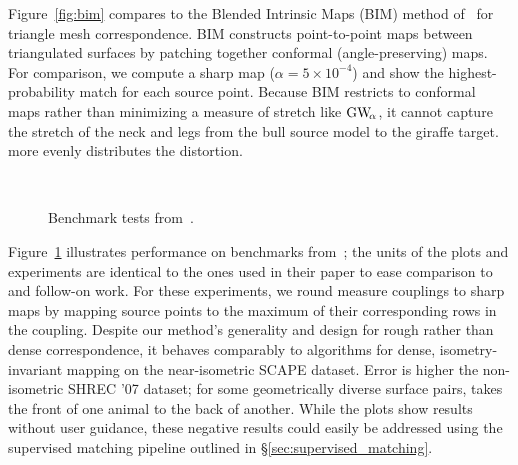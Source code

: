 Figure~\ref{fig:bim} compares to the Blended Intrinsic Maps (BIM) method of~\cite{kim-2011} for triangle mesh correspondence.  BIM constructs point-to-point maps between triangulated surfaces by patching together conformal (angle-preserving) maps.  For comparison, we compute a sharp \GWa map ($\alpha\!=\!5\!\times\!10^{-4}$) and show the highest-probability match for each source point.  Because BIM restricts to conformal maps rather than minimizing a measure of stretch like $\GWa$, it cannot capture the stretch of the neck and legs from the bull source model to the giraffe target.  \GWa more evenly distributes the distortion.

\begin{figure}[t]\centering
{}\\\vspace{-.2in}
\caption{Benchmark tests from~\protect\cite{kim-2011}.\vspace{-.2in}}\label{fig:benchmarks}
\end{figure}

Figure~\ref{fig:benchmarks} illustrates performance on benchmarks from~\cite{kim-2011}; the units of the plots and experiments are identical to the ones used in their paper to ease comparison to~\cite{kim-2011} and follow-on work.  For these experiments, we round measure couplings to sharp maps by mapping source points to the maximum of their corresponding rows in the coupling.  Despite our method's generality and design for rough rather than dense correspondence, it behaves comparably to algorithms for dense, isometry-invariant mapping on the near-isometric SCAPE dataset.  Error is higher the non-isometric SHREC '07 dataset; for some geometrically diverse surface pairs, \GWa takes the front of one animal to the back of another.  While the plots show results without user guidance, these negative results could easily be addressed using the supervised matching pipeline outlined in \S\ref{sec:supervised_matching}.  